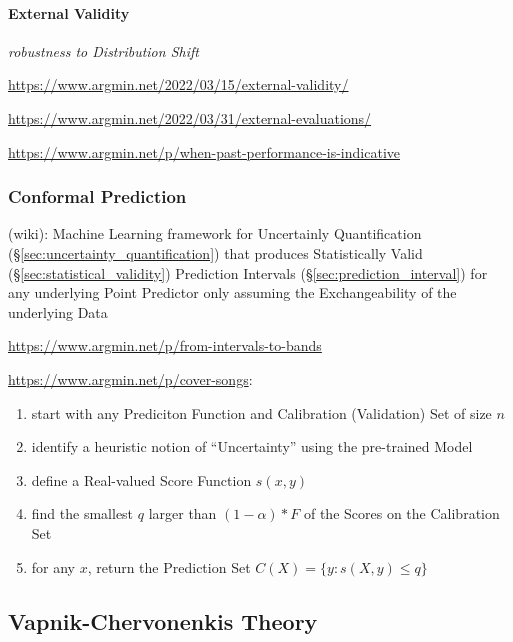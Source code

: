\paragraph{External Validity}\label{sec:external_validity}\hfill

\emph{robustness to Distribution Shift}

\url{https://www.argmin.net/2022/03/15/external-validity/}

\url{https://www.argmin.net/2022/03/31/external-evaluations/}

\url{https://www.argmin.net/p/when-past-performance-is-indicative}



\subsubsection{Conformal Prediction}\label{sec:conformal_prediction}

(wiki):
Machine Learning framework for Uncertainly Quantification
(\S\ref{sec:uncertainty_quantification}) that produces Statistically Valid
(\S\ref{sec:statistical_validity}) Prediction Intervals
(\S\ref{sec:prediction_interval}) for any underlying Point Predictor only
assuming the Exchangeability of the underlying Data

\url{https://www.argmin.net/p/from-intervals-to-bands}

\url{https://www.argmin.net/p/cover-songs}:

\begin{enumerate}
  \item start with any Prediciton Function and Calibration (Validation) Set of
    size $n$
  \item identify a heuristic notion of ``Uncertainty'' using the pre-trained
    Model
  \item define a Real-valued Score Function $s(x,y)$
  \item find the smallest $q$ larger than $(1-\alpha)*F$ of the Scores on the
    Calibration Set
  \item for any $x$, return the Prediction Set $C(X) = \{ y : s(X,y) \leq q \}$
\end{enumerate}



\subsection{Vapnik-Chervonenkis Theory}\label{sec:vc_theory}

